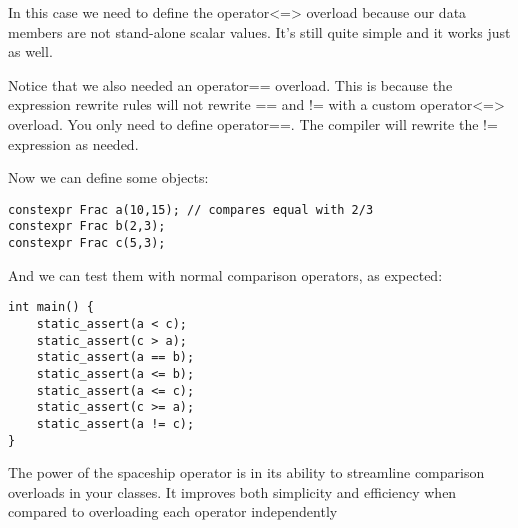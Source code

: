 In this case we need to define the operator<=> overload because our data members are not stand-alone scalar values. It's still quite simple and it works just as well.

Notice that we also needed an operator== overload. This is because the expression rewrite rules will not rewrite == and != with a custom operator<=> overload. You only need to define operator==. The compiler will rewrite the != expression as needed.

Now we can define some objects:

\begin{lstlisting}[style=styleCXX]
constexpr Frac a(10,15); // compares equal with 2/3
constexpr Frac b(2,3);
constexpr Frac c(5,3);
\end{lstlisting}

And we can test them with normal comparison operators, as expected:

\begin{lstlisting}[style=styleCXX]
int main() {
	static_assert(a < c);
	static_assert(c > a);
	static_assert(a == b);
	static_assert(a <= b);
	static_assert(a <= c);
	static_assert(c >= a);
	static_assert(a != c);
}
\end{lstlisting}

The power of the spaceship operator is in its ability to streamline comparison overloads in your classes. It improves both simplicity and efficiency when compared to overloading each operator independently
















